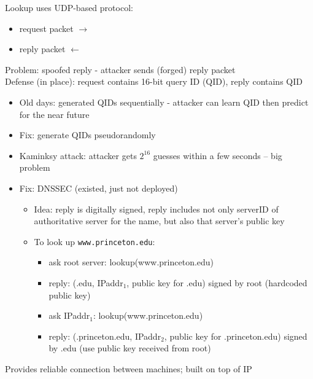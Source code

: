 Lookup uses UDP-based protocol:
\begin{itemize}
    \item request packet $\longrightarrow$
    \item reply packet $\longleftarrow$
\end{itemize}
Problem: spoofed reply - attacker sends (forged) reply packet\\
Defense (in place): request contains 16-bit query ID (QID), reply contains QID
\begin{itemize}
    \item Old days: generated QIDs sequentially - attacker can learn QID then
        predict for the near future
    \item Fix: generate QIDs pseudorandomly
    \item Kaminksy attack: attacker gets $2^{16}$ guesses within a few seconds
        -- big problem
    \item Fix: DNSSEC (existed, just not deployed)
    \begin{itemize}
        \item Idea: reply is digitally signed, reply includes not only serverID
            of authoritative server for the name, but also that server's public
            key
        \item To look up \texttt{www.princeton.edu}:
        \begin{itemize}
            \item ask root server: lookup(www.princeton.edu)
            \item reply: (.edu, IPaddr$_1$, public key for .edu) signed by root
                (hardcoded public key)
            \item ask IPaddr$_1$: lookup(www.princeton.edu)
            \item reply: (.princeton.edu, IPaddr$_2$, public key for
                .princeton.edu) signed by .edu (use public key received from
                root)
        \end{itemize}
    \end{itemize}
\end{itemize}
Provides reliable connection between machines; built on top of IP

